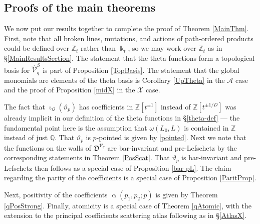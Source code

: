 \documentclass{amsart}
\let\bb=\mathbb
\let\f=\mathfrak
\let\s=\mathcal
\let\wh=\widehat
\newcommand {\kk} {\Bbbk}
\newcommand {\sQ} {\mathcal{Q}}
\renewcommand{\iota}{\upiota}
\renewcommand{\alpha}{\upalpha}
\theoremstyle{plain}%
\newcommand{\Z}{{\mathbb Z}}
\theoremstyle{definition}
\theoremstyle{remark}
\newenvironment{myproof}[1][\proofname]{\proof[#1]\mbox{}}{\endproof}
\begin{document}
\subsection{Proofs of the main theorems}\label{MainProof}
\begin{myproof}[Proof of Theorem \ref{MainThm}]
We now put our results together to complete the proof of Theorem \ref{MainThm}.  First, note that all broken lines, mutations, and actions of path-ordered products could be defined over $\bb{Z}_t$ rather than $\kk_t$, so we may work  over $\bb{Z}_t$ as in \S \ref{MainResultsSection}.  The statement that the theta functions form a topological basis for $\wh{\s{V}}_q^S$ is part of Proposition \ref{TopBasis}.  The statement that the global monomials are elements of the theta basis is Corollary \ref{UpTheta} in the $\s{A}$ case and the proof of Proposition \ref{midX} in the $\s{X}$ case.

The fact that $\iota_{\sQ}(\vartheta_p)$ has coefficients in $\Z[t^{\pm 1}]$ instead of $\Z[t^{\pm 1/D}]$ was already implicit in our definition of the theta functions in \S \ref{theta-def} --- the fundamental point here is the assumption that $\omega(L_0,L)$ is contained in $\bb{Z}$ instead of just $\bb{Q}$.  That $\vartheta_p$ is $p$-pointed is given by \eqref{pointed}.  Next we note that the functions on the walls of $\f{D}^{\s{V}_q}$ are bar-invariant and pre-Lefschetz by the corresponding statements in Theorem \ref{PosScat}.  That $\vartheta_p$ is bar-invariant and pre-Lefschetz then follows as a special case of Proposition \ref{bar-pL}.  The claim regarding the parity of the coefficients is a special case of Proposition \ref{ParitProp}.

Next, positivity of the coefficients $\alpha(p_1,p_2;p)$ is given by Theorem \ref{qPosStrong}.  Finally, atomicity is a special case of Theorem \ref{qAtomic}, with the extension to the principal coefficients scattering atlas following as in \S \ref{AtlasX}.
\end{myproof}
\end{document}
